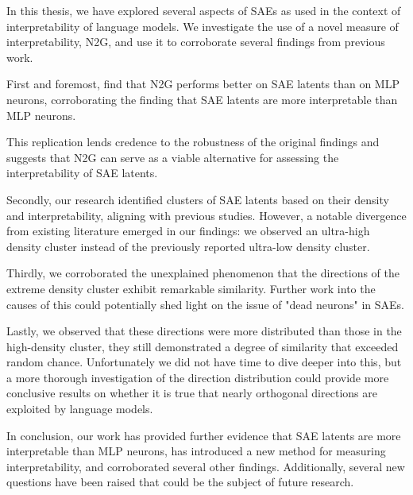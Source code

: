 In this thesis, we have explored several aspects of \acp{SAE} as used in the context of interpretability of language models.
We investigate the use of a novel measure of interpretability, \ac{N2G}, and use it to corroborate several findings from previous work.

First and foremost, find that \ac{N2G} performs better on \ac{SAE} latents than on \ac{MLP} neurons, corroborating the finding that \ac{SAE} latents are more interpretable than \ac{MLP} neurons.

This replication lends credence to the robustness of the original findings and suggests that \ac{N2G} can serve as a viable alternative for assessing the interpretability of \ac{SAE} latents.

Secondly, our research identified clusters of \ac{SAE} latents based on their density and interpretability, aligning with previous studies.
However, a notable divergence from existing literature emerged in our findings: we observed an ultra-high density cluster instead of the previously reported ultra-low density cluster. 

Thirdly, we corroborated the unexplained phenomenon that the directions of the extreme density cluster exhibit remarkable similarity.
Further work into the causes of this could potentially shed light on the issue of "dead neurons" in \acp{SAE}.

Lastly, we observed that these directions were more distributed than those in the high-density cluster, they still demonstrated a degree of similarity that exceeded random chance.
Unfortunately we did not have time to dive deeper into this, but a more thorough investigation of the direction distribution could provide more conclusive results on whether it is true that nearly orthogonal directions are exploited by language models.

In conclusion, our work has provided further evidence that \ac{SAE} latents are more interpretable than \ac{MLP} neurons, has introduced a new method for measuring interpretability, and corroborated several other findings.
Additionally, several new questions have been raised that could be the subject of future research.
